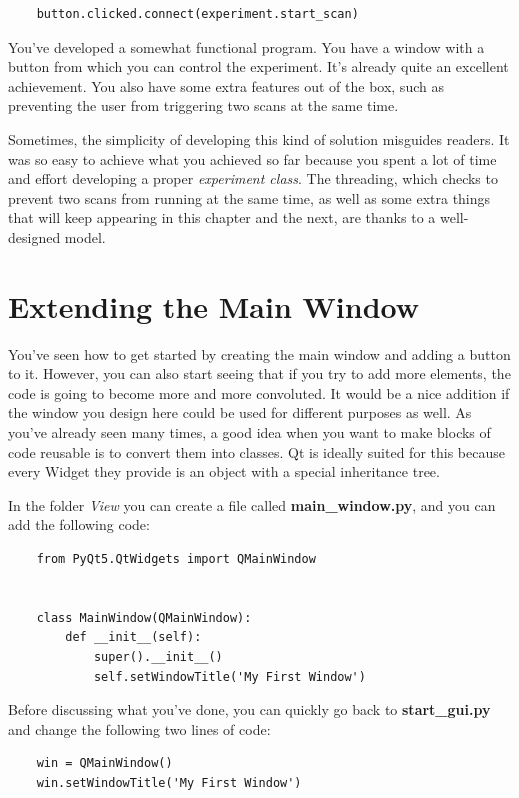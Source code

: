 \begin{verbatim}
    button.clicked.connect(experiment.start_scan)
\end{verbatim}

You've developed a somewhat functional program. You have a window with a button from which you can control the experiment. It's already quite an excellent achievement. You also have some extra features out of the box, such as preventing the user from triggering two scans at the same time.

Sometimes, the simplicity of developing this kind of solution misguides readers. It was so easy to achieve what you achieved so far because you spent a lot of time and effort developing a proper \emph{experiment class}. The threading, which checks to prevent two scans from running at the same time, as well as some extra things that will keep appearing in this chapter and the next, are thanks to a well-designed model.

\section{Extending the Main Window}\label{sec:extending-main-window}
You've seen how to get started by creating the main window and adding a button to it. However, you can also start seeing that if you try to add more elements, the code is going to become more and more convoluted. It would be a nice addition if the window you design here could be used for different purposes as well. As you've already seen many times, a good idea when you want to make blocks of code reusable is to convert them into classes. Qt is ideally suited for this because every Widget they provide is an object with a special inheritance tree.

In the folder \emph{View} you can create a file called \textbf{main\_window.py}, and you can add the following code:

\begin{verbatim}
    from PyQt5.QtWidgets import QMainWindow


    class MainWindow(QMainWindow):
        def __init__(self):
            super().__init__()
            self.setWindowTitle('My First Window')
\end{verbatim}

Before discussing what you've done, you can quickly go back to \textbf{start\_gui.py} and change the following two lines of code:

\begin{verbatim}
    win = QMainWindow()
    win.setWindowTitle('My First Window')
\end{verbatim}

